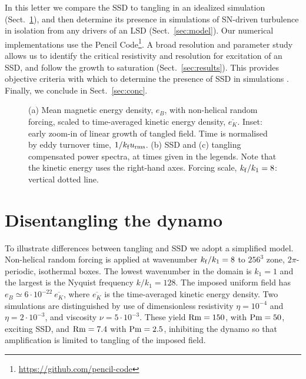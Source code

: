 \documentclass[preprint2]{aastex63}
\newcommand\Rm{{\rm Rm} }
\newcommand\Pm{{\rm Pm} }
\newcommand\kf{k_{\rm f} }
\begin{document}
In this letter we compare the SSD to tangling in an idealized simulation
(Sect.~\ref{sec:ssd-tang}), and then determine its presence in simulations of SN-driven 
turbulence in isolation from any drivers of an LSD (Sect.~\ref{sec:model}). 
Our numerical implementations use the {\sc Pencil Code}\footnote{
\href{https://github.com/pencil-code}{https://github.com/pencil-code}}.
A broad resolution and parameter study allows us to identify the critical
resistivity and resolution for excitation of an SSD, and follow the growth to
saturation (Sect.~\ref{sec:results}).
This provides objective criteria with which to determine the presence of SSD
in simulations \citep[such as][]{Gent:2013b,GE20,SBADMN19}.
Finally, we conclude in Sect.~\ref{sec:conc}.
\begin{figure*}
\caption{
 (a) Mean magnetic energy density, $e_B$, with non-helical random forcing,
 scaled to time-averaged kinetic energy density, $\overline{e_K}$.
 Inset: early zoom-in of linear growth of tangled field.
 Time is normalised by eddy turnover time, $1/\kf {u_{\rm rms}}$.
 (b) SSD and (c) tangling compensated power spectra, at times given in the
 legends.  Note that the kinetic energy uses the right-hand axes.
  Forcing scale, $\kf/k_1=8$: vertical dotted line.
\label{fig:tangling}}
\end{figure*}

\section{Disentangling the dynamo} \label{sec:ssd-tang}

 To illustrate differences between tangling and SSD we adopt a simplified
 model.
 Non-helical random forcing is applied at wavenumber $\kf/k_1=8$ to
 $256^3$ zone, $2\pi$-periodic, isothermal boxes.
 The lowest wavenumber in the domain is $k_1=1$ and the largest is the Nyquist
 frequency $k/k_1 = 128$.
 The imposed uniform field has $e_B\simeq6\cdot10^{-22}~\overline{e_K}$, where
 $\overline{e_K}$ is the time-averaged kinetic energy density.
 Two simulations are distinguished by use of dimensionless
 resistivity $\eta=10^{-4}$
 and $\eta=2\cdot10^{-3}$, and viscosity $\nu=5\cdot10^{-3}$.
 These yield $\Rm=150$, with $\Pm = 50$, exciting SSD, and $\Rm=7.4$ with
 $\Pm=2.5$, inhibiting the dynamo so that amplification is limited to tangling
 of the imposed field.
\end{document}
